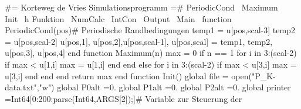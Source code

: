 \documentclass[10pt,fleqn,%
reqno,a4paper]{article}
\begin{document}
\nwenddocs{}\nwdocspar
\nwenddocs{}\endmoddef\nwstartdeflinemarkup\nwenddeflinemarkup
#= 
Korteweg de Vries Simulationsprogramm
=#
\LA{}PeriodicCond~{\nwtagstyle{}}\RA{}
\LA{}Maximum~{\nwtagstyle{}}\RA{}
\LA{}Init~{\nwtagstyle{}}\RA{}
\LA{}h Funktion~{\nwtagstyle{}}\RA{}
\LA{}NumCalc~{\nwtagstyle{}}\RA{}
\LA{}IntCon~{\nwtagstyle{}}\RA{}
\LA{}Output~{\nwtagstyle{}}\RA{}
\LA{}Main~{\nwtagstyle{}}\RA{}
\nwendcode{}\nwdocspar
\nwenddocs{}\endmoddef\nwstartdeflinemarkup{}\nwenddeflinemarkup
function PeriodicCond(pos)# Periodische Randbedingungen
  temp1 = u[pos,scal-3]
  temp2 = u[pos,scal-2]
  u[pos,1], u[pos,2],u[pos,scal-1], u[pos,scal] =
  temp1, temp2, u[pos,3], u[pos,4]
end
\nwendcode{}\nwdocspar
\nwenddocs{}\endmoddef\nwstartdeflinemarkup{}\nwenddeflinemarkup
function Maximum(n)
  max = 0
  if n == 1
    for i in 3:(scal-2)
      if max < u[1,i]
        max = u[1,i]
      end
    end
  else
    for i in 3:(scal-2)
      if max < u[3,i]
        max = u[3,i]
      end
    end
  end
  return max
end
\nwendcode{}\nwdocspar
\nwenddocs{}\endmoddef\nwstartdeflinemarkup{}\nwenddeflinemarkup
function Init()
  global file = open("P_K-data.txt","w")
  global P0alt =0.
  global P1alt =0.
  global P2alt =0.
  global printer =Int64[0:200:parse(Int64,ARGS[2]);]# Variable zur Steuerung der 
\end{document}
